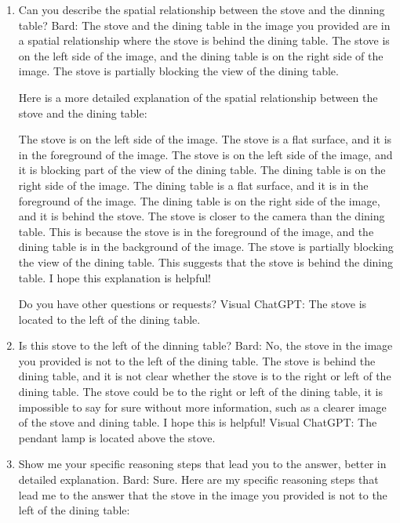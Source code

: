 \begin{enumerate}
    \item Can you describe the spatial relationship between the stove and the dinning table?
    \subitem Bard: 
    The stove and the dining table in the image you provided are in a spatial relationship where the stove is behind the dining table. The stove is on the left side of the image, and the dining table is on the right side of the image. The stove is partially blocking the view of the dining table.
    
    Here is a more detailed explanation of the spatial relationship between the stove and the dining table:
    
    The stove is on the left side of the image. The stove is a flat surface, and it is in the foreground of the image. The stove is on the left side of the image, and it is blocking part of the view of the dining table.
    The dining table is on the right side of the image. The dining table is a flat surface, and it is in the foreground of the image. The dining table is on the right side of the image, and it is behind the stove.
    The stove is closer to the camera than the dining table. This is because the stove is in the foreground of the image, and the dining table is in the background of the image.
    The stove is partially blocking the view of the dining table. This suggests that the stove is behind the dining table.
    I hope this explanation is helpful!
    
    Do you have other questions or requests?
    \subitem Visual ChatGPT: The stove is located to the left of the dining table.
    \item Is this stove to the left of the dinning table?
    \subitem Bard: 
    No, the stove in the image you provided is not to the left of the dining table. The stove is behind the dining table, and it is not clear whether the stove is to the right or left of the dining table.
    The stove could be to the right or left of the dining table, it is impossible to say for sure without more information, such as a clearer image of the stove and dining table.
    I hope this is helpful! 
    \subitem Visual ChatGPT: The pendant lamp is located above the stove.
    \item Show me your specific reasoning steps that lead you to the answer, better in detailed explanation.
    \subitem Bard: 
    Sure. Here are my specific reasoning steps that lead me to the answer that the stove in the image you provided is not to the left of the dining table:
    

\end{enumerate}
